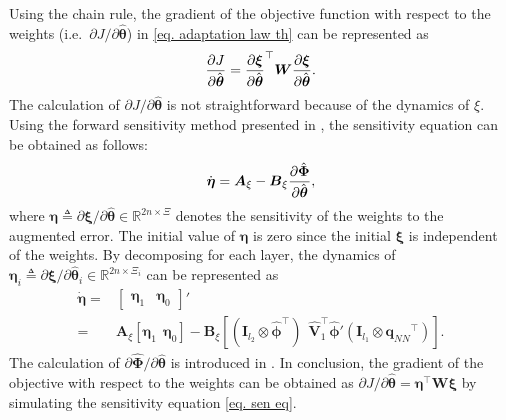 \documentclass[letterpaper, 10 pt, conference]{ieeeconf}  %
\newcommand\ie{\textrm{i.e.\ }}
\newcommand\R{\mathbb{R}}
\newcommand*{\mv}[1]{\boldsymbol{#1}}
\newcommand*{\mm}[1]{\boldsymbol{#1}}
\begin{document}
Using the chain rule, the gradient of the objective function with respect to the weights (\ie $\partial J/\partial {\hat{\mv\theta}}$) in \eqref{eq. adaptation law th} can be represented as
\begin{equation}
    {\partial J\over\partial {\hat{\mv\theta}}}
    =
    {\partial \mv\xi\over\partial {\hat{\mv\theta}}}^\top 
    \mm W
    {\partial \mv\xi\over\partial {\hat{\mv\theta}}}
    .
\end{equation}
The calculation of $\partial J/\partial {\hat{\mv\theta}}$ is not straightforward because of the dynamics of $\xi$.
Using the forward sensitivity method presented in \cite{RN34}, the sensitivity equation can be obtained as follows:
\begin{equation}
    \dot {\mm \eta} =
    \mm A_\xi - \mm B_\xi 
    {\partial \hat{\mv\Phi}\over\partial {\hat{\mv\theta}}}
    ,
    \label{eq. sen eq}
\end{equation}
where ${\mm \eta}\triangleq \partial \mv\xi/\partial {\hat{\mv\theta}}\in\R^{2n\times \Xi}$ denotes the sensitivity of the weights to the augmented error.
The initial value of ${\mm \eta}$ is zero since the initial $\mv\xi$ is independent of the weights.
By decomposing for each layer, the dynamics of ${\mm \eta}_i\triangleq \partial \mv\xi/\partial {\hat{\mv\theta}}_i\in\R^{2n\times \Xi_i}$ can be represented as
\begin{equation}
    \begin{aligned}
        \dot{\mm \eta} =&
        \begin{bmatrix}
            {\mm \eta}_1&{\mm \eta}_0
        \end{bmatrix}'
        \\
        =&
        \mm A_\xi
        [
            {\mm \eta}_1
            \ \ 
            {\mm \eta}_0
        ]
        -\mm B_\xi
        [
            (\mm I_{l_2}\otimes \hat{\mv\phi}^\top )
            \ \ 
            \hat {\mm V}_1^\top \hat{\mv\phi}'(\mm I_{l_1}\otimes {\mv q_{NN}}^\top )
        ]
        .
    \end{aligned}
\end{equation}
The calculation of $\partial \hat{\mv\Phi}/\partial{\hat{\mv\theta}}$ is introduced in \cite{RN36}.
In conclusion, the gradient of the objective with respect to the weights can be obtained as ${\partial J/\partial {\hat{\mv\theta}}} = {\mm \eta}^\top\mm W\mv\xi$ by simulating the sensitivity equation \eqref{eq. sen eq}.
\end{document}
